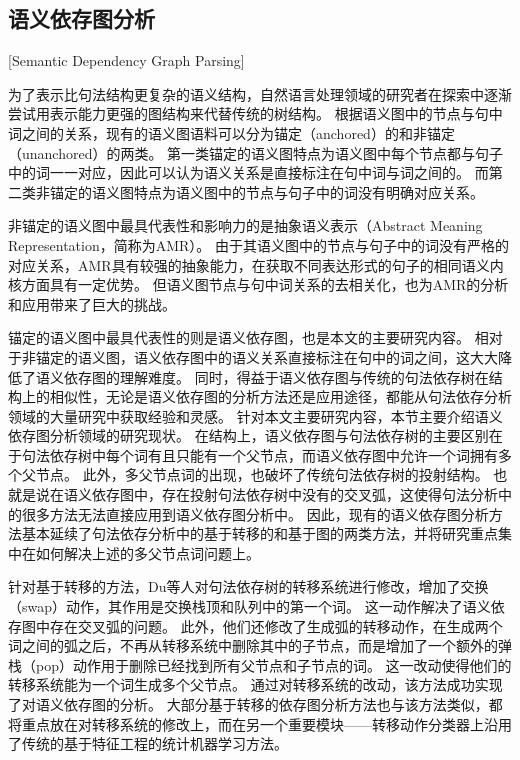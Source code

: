 \subsection{语义依存图分析}[Semantic Dependency Graph Parsing]

为了表示比句法结构更复杂的语义结构，自然语言处理领域的研究者在探索中逐渐尝试用表示能力更强的图结构来代替传统的树结构。
根据语义图中的节点与句中词之间的关系，现有的语义图语料可以分为锚定（anchored）的和非锚定（unanchored）的两类。
第一类锚定的语义图特点为语义图中每个节点都与句子中的词一一对应，因此可以认为语义关系是直接标注在句中词与词之间的。
而第二类非锚定的语义图特点为语义图中的节点与句子中的词没有明确对应关系。

非锚定的语义图中最具代表性和影响力的是抽象语义表示（Abstract Meaning Representation，简称为AMR）。\cite{banarescu-etal-2013-abstract}
由于其语义图中的节点与句子中的词没有严格的对应关系，AMR具有较强的抽象能力，在获取不同表达形式的句子的相同语义内核方面具有一定优势。
但语义图节点与句中词关系的去相关化，也为AMR的分析和应用带来了巨大的挑战。

锚定的语义图中最具代表性的则是语义依存图，也是本文的主要研究内容。
相对于非锚定的语义图，语义依存图中的语义关系直接标注在句中的词之间，这大大降低了语义依存图的理解难度。
同时，得益于语义依存图与传统的句法依存树在结构上的相似性，无论是语义依存图的分析方法还是应用途径，都能从句法依存分析领域的大量研究中获取经验和灵感。
针对本文主要研究内容，本节主要介绍语义依存图分析领域的研究现状。
在结构上，语义依存图与句法依存树的主要区别在于句法依存树中每个词有且只能有一个父节点，而语义依存图中允许一个词拥有多个父节点。
此外，多父节点词的出现，也破坏了传统句法依存树的投射结构。
也就是说在语义依存图中，存在投射句法依存树中没有的交叉弧，这使得句法分析中的很多方法无法直接应用到语义依存图分析中。
因此，现有的语义依存图分析方法基本延续了句法依存分析中的基于转移的和基于图的两类方法，并将研究重点集中在如何解决上述的多父节点词问题上。

针对基于转移的方法，Du等人对句法依存树的转移系统进行修改\cite{du-etal-2014-peking}，增加了交换（swap）动作，其作用是交换栈顶和队列中的第一个词。
这一动作解决了语义依存图中存在交叉弧的问题。
此外，他们还修改了生成弧的转移动作，在生成两个词之间的弧之后，不再从转移系统中删除其中的子节点，而是增加了一个额外的弹栈（pop）动作用于删除已经找到所有父节点和子节点的词。
这一改动使得他们的转移系统能为一个词生成多个父节点。
通过对转移系统的改动，该方法成功实现了对语义依存图的分析。
大部分基于转移的依存图分析方法\cite{sagae-tsujii-2008-shift,titov-etal-2009-online}也与该方法类似，都将重点放在对转移系统的修改上，而在另一个重要模块——转移动作分类器上沿用了传统的基于特征工程的统计机器学习方法。

